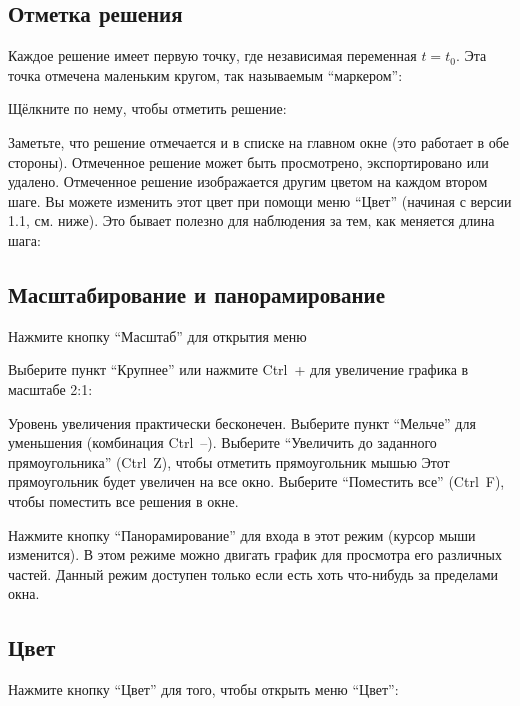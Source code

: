 \documentclass[12pt]{article}
\begin{document}


\subsection{Отметка решения}
Каждое решение имеет первую точку, где независимая переменная \(t=t_0\).
Эта точка отмечена маленьким кругом, так называемым ``маркером'':


Щёлкните по нему, чтобы отметить решение:


Заметьте, что решение отмечается и в списке на главном окне 
(это работает в обе стороны).
Отмеченное решение может быть просмотрено, экспортировано или удалено.
Отмеченное решение изображается другим цветом на каждом втором шаге.
Вы можете изменить этот цвет при помощи меню ``Цвет'' (начиная с версии 1.1, см. ниже).
Это бывает полезно для наблюдения за тем, как меняется длина шага:



\subsection{Масштабирование и панорамирование}
Нажмите кнопку ``Масштаб''  для открытия меню


Выберите пункт ``Крупнее'' или нажмите Ctrl~+ для увеличение графика в масштабе 2:1:


Уровень увеличения практически бесконечен.
Выберите пункт ``Мельче'' для уменьшения (комбинация Ctrl~--).
Выберите ``Увеличить до заданного прямоугольника'' (Ctrl~Z), чтобы отметить прямоугольник мышью
Этот прямоугольник будет увеличен на все окно.
Выберите ``Поместить все'' (Ctrl~F), чтобы поместить все решения в окне.

Нажмите кнопку ``Панорамирование''  
для входа в этот режим (курсор мыши изменится).
В этом режиме можно двигать график для просмотра его различных частей. 
Данный режим доступен только если есть хоть что-нибудь за пределами окна.


\subsection{Цвет}
Нажмите кнопку ``Цвет''  для того,
чтобы открыть меню ``Цвет'':
\end{document}
